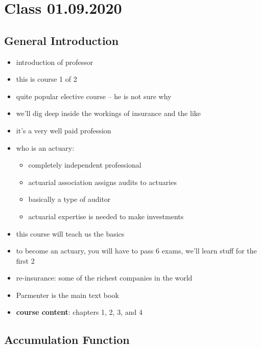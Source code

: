 \documentclass[../00_main.tex]{subfiles}
\begin{document}
\section{Class 01.09.2020}

\subsection{General Introduction}

\begin{itemize}
    \item introduction of professor
    \item this is course 1 of 2
    \item quite popular elective course -- he is not sure why
    \item we'll dig deep inside the workings of insurance and the like
    \item it's a very well paid profession
    \item who is an actuary:
        \begin{itemize}
            \item completely independent professional
            \item actuarial association assigns audits to actuaries
            \item basically a type of auditor
            \item actuarial expertise is needed to make investments
        \end{itemize}
    \item this course will teach us the basics
    \item to become an actuary, you will have to pass 6 exams, we'll learn
        stuff for the first 2
    \item re-insurance: some of the richest companies in the world
    \item Parmenter is the main text book
    \item \textbf{course content}: chapters 1, 2, 3, and 4
\end{itemize}

\subsection{Accumulation Function}
\end{document}
